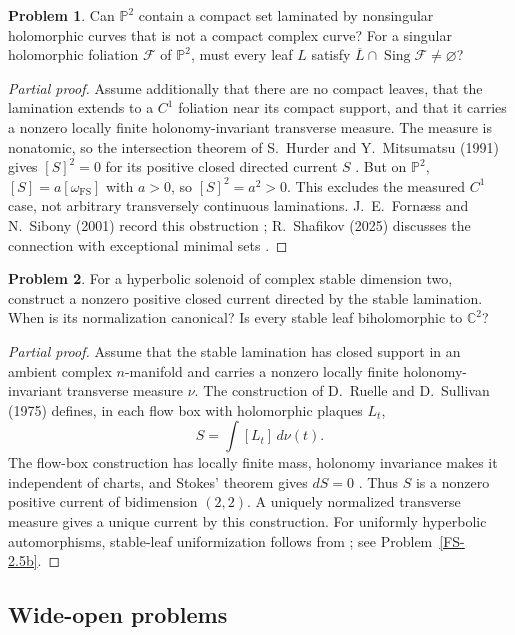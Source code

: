 \documentclass[11pt,reqno]{amsart}
\theoremstyle{definition}
\newtheorem{problem}{Problem}[section]
\theoremstyle{remark}
\begin{document}
\begin{problem}\label{FS-2.29}
Can $\mathbb P^2$ contain a compact set laminated by nonsingular holomorphic curves that is not a compact complex curve? For a singular holomorphic foliation $\mathcal F$ of $\mathbb P^2$, must every leaf $L$ satisfy $\overline L\cap\operatorname{Sing}\mathcal F\ne\varnothing$?
\end{problem}
\begin{proof}[Partial proof]
Assume additionally that there are no compact leaves, that the lamination extends to a $C^1$ foliation near its compact support, and that it carries a nonzero locally finite holonomy-invariant transverse measure. The measure is nonatomic, so the intersection theorem of S.~Hurder and Y.~Mitsumatsu (1991) gives $[S]^2=0$ for its positive closed directed current $S$ \cite{FS-HM91}. But on $\mathbb P^2$, $[S]=a[\omega_{\mathrm{FS}}]$ with $a>0$, so $[S]^2=a^2>0$. This excludes the measured $C^1$ case, not arbitrary transversely continuous laminations. J.~E.~Forn\ae ss and N.~Sibony (2001) record this obstruction \cite[Question~2.29]{FS2001}; R.~Shafikov (2025) discusses the connection with exceptional minimal sets \cite{FS-Shafikov}.
\end{proof}

\begin{problem}\label{FS-2.28}
For a hyperbolic solenoid of complex stable dimension two, construct a nonzero positive closed current directed by the stable lamination. When is its normalization canonical? Is every stable leaf biholomorphic to $\mathbb C^2$?
\end{problem}
\begin{proof}[Partial proof]
Assume that the stable lamination has closed support in an ambient complex $n$-manifold and carries a nonzero locally finite holonomy-invariant transverse measure $\nu$. The construction of D.~Ruelle and D.~Sullivan (1975) defines, in each flow box with holomorphic plaques $L_t$,
\[
 S=\int [L_t]\,d\nu(t).
\]
The flow-box construction has locally finite mass, holonomy invariance makes it independent of charts, and Stokes' theorem gives $dS=0$ \cite{FS-RS75}. Thus $S$ is a nonzero positive current of bidimension $(2,2)$. A uniquely normalized transverse measure gives a unique current by this construction. For uniformly hyperbolic automorphisms, stable-leaf uniformization follows from \cite{FS-BV}; see Problem~\ref{FS-2.5b}.
\end{proof}

\subsection{Wide-open problems}
\end{document}
